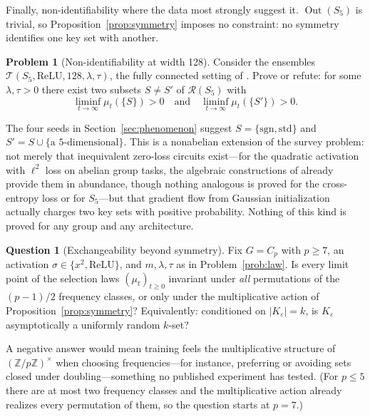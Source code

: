 \documentclass[11pt]{amsart}
\theoremstyle{plain}
\theoremstyle{definition}
\newtheorem{problem}[theorem]{Problem}
\newtheorem{question}[theorem]{Question}
\DeclareMathOperator{\Out}{Out}
\newcommand{\Z}{\mathbb{Z}}
\newcommand{\Rcl}{\mathcal{R}}
\begin{document}
Finally, non-identifiability where the data most strongly suggest it. $\Out(S_5)$ is trivial, so Proposition~\ref{prop:symmetry} imposes no constraint: no symmetry identifies one key set with another.

\begin{problem}[Non-identifiability at width 128]\label{prob:nonident}
Consider the ensembles $\mathcal{T}(S_5, \mathrm{ReLU}, 128, \lambda, \tau)$, the fully connected setting of \cite{chughtai2023}. Prove or refute: for some $\lambda, \tau > 0$ there exist two subsets $S \neq S'$ of $\Rcl(S_5)$ with
\[
   \liminf_{t \to \infty} \mu_t(\{S\}) > 0 \quad\text{and}\quad \liminf_{t \to \infty} \mu_t(\{S'\}) > 0.
\]
\end{problem}

The four seeds in Section~\ref{sec:phenomenon} suggest $S = \{\mathrm{sgn}, \mathrm{std}\}$ and $S' = S \cup \{\text{a 5-dimensional}\}$. This is a nonabelian extension of the survey problem: not merely that inequivalent zero-loss circuits exist---for the quadratic activation with $\ell^2$ loss on abelian group tasks, the algebraic constructions of \cite{tian2024} already provide them in abundance, though nothing analogous is proved for the cross-entropy loss or for $S_5$---but that gradient flow from Gaussian initialization actually charges two key sets with positive probability. Nothing of this kind is proved for any group and any architecture.

\begin{question}[Exchangeability beyond symmetry]\label{q:exchangeable}
Fix $G = C_p$ with $p \geq 7$, an activation $\sigma \in \{x^2, \mathrm{ReLU}\}$, and $m, \lambda, \tau$ as in Problem~\ref{prob:law}. Is every limit point of the selection laws $(\mu_t)_{t \geq 0}$ invariant under \emph{all} permutations of the $(p-1)/2$ frequency classes, or only under the multiplicative action of Proposition~\ref{prop:symmetry}? Equivalently: conditioned on $|K_\varepsilon| = k$, is $K_\varepsilon$ asymptotically a uniformly random $k$-set?
\end{question}

A negative answer would mean training feels the multiplicative structure of $(\Z/p\Z)^\times$ when choosing frequencies---for instance, preferring or avoiding sets closed under doubling---something no published experiment has tested. (For $p \leq 5$ there are at most two frequency classes and the multiplicative action already realizes every permutation of them, so the question starts at $p = 7$.)
\end{document}
